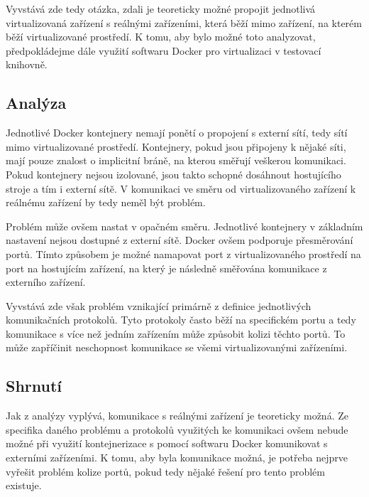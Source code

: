 Vyvstává zde tedy otázka, zdali je teoreticky možné propojit jednotlivá virtualizovaná zařízení s reálnými zařízeními, která běží mimo zařízení, na kterém běží virtualizované prostředí. K tomu, aby bylo možné toto analyzovat, předpokládejme dále využití softwaru Docker pro virtualizaci v testovací knihovně.

\subsection{Analýza}

Jednotlivé Docker kontejnery nemají ponětí o propojení s externí sítí, tedy sítí mimo virtualizované prostředí. Kontejnery, pokud jsou připojeny k nějaké síti, mají pouze znalost o implicitní bráně, na kterou směřují veškerou komunikaci. Pokud kontejnery nejsou izolované, jsou takto schopné dosáhnout hostujícího stroje a tím i externí sítě. V komunikaci ve směru od virtualizovaného zařízení k reálnému zařízení by tedy neměl být problém.\,\cite{docker_brige_overview}

Problém může ovšem nastat v opačném směru. Jednotlivé kontejnery v základním nastavení nejsou dostupné z externí sítě. Docker ovšem podporuje přesměrování portů. Tímto způsobem je možné namapovat port z virtualizovaného prostředí na port na hostujícím zařízení, na který je následně směřována komunikace z externího zařízení.\,\cite{docker_ports}

Vyvstává zde však problém vznikající primárně z definice jednotlivých komunikačních protokolů. Tyto protokoly často běží na specifickém portu a tedy komunikace s více než jedním zařízením může způsobit kolizi těchto portů. To může zapříčinit neschopnost komunikace se všemi virtualizovanými zařízeními. 

\subsection{Shrnutí}

Jak z analýzy vyplývá, komunikace s reálnými zařízení je teoreticky možná. Ze specifika daného problému a protokolů využitých ke komunikaci ovšem nebude možné při využití kontejnerizace s pomocí softwaru Docker komunikovat s externími zařízeními. K tomu, aby byla komunikace možná, je potřeba nejprve vyřešit problém kolize portů, pokud tedy nějaké řešení pro tento problém existuje. 

